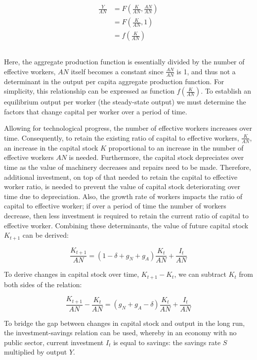 \documentclass[
]{article}
\begin{document}
\[\begin{matrix}
\begin{matrix}
\frac{Y}{AN} & {= F\left( \frac{K}{AN},\frac{AN}{AN} \right)} \\
 & {= F\left( \frac{K}{AN},1 \right)} \\
 & {= f\left( \frac{K}{AN} \right)} \\
\end{matrix} \\
\end{matrix}\]

Here, the aggregate production function is essentially divided by the
number of effective workers, {\(AN\)} itself becomes a constant since
{\(\frac{AN}{AN}\)} is 1, and thus not a determinant in the output per
capita aggregate production function. For simplicity, this relationship
can be expressed as function {\(f\left( \frac{K}{AN} \right)\)}. To
establish an equilibrium output per worker (the steady-state output) we
must determine the factors that change capital per worker over a period
of time.

Allowing for technological progress, the number of effective workers
increases over time. Consequently, to retain the existing ratio of
capital to effective workers, {\(\frac{K}{AN}\)}, an increase in the
capital stock {\(K\)} proportional to an increase in the number of
effective workers {\(AN\)} is needed. Furthermore, the capital stock
depreciates over time as the value of machinery decreases and repairs
need to be made. Therefore, additional investment, on top of that needed
to retain the capital to effective worker ratio, is needed to prevent
the value of capital stock deteriorating over time due to depreciation.
Also, the growth rate of workers impacts the ratio of capital to
effective worker; if over a period of time the number of workers
decrease, then less investment is required to retain the current ratio
of capital to effective worker. Combining these determinants, the value
of future capital stock {\(K_{t + 1}\)} can be derived:

{\[\frac{K_{t + 1}}{AN} = (1 - \delta + g_{N} + g_{A})\frac{K_{t}}{AN} + \frac{I_{t}}{AN}\]}

To derive changes in capital stock over time, {\(K_{t + 1} - K_{t}\)},
we can subtract {\(K_{t}\)} from both sides of the relation:

{\[\frac{K_{t + 1}}{AN} - \frac{K_{t}}{AN} = (g_{N} + g_{A} - \delta)\frac{K_{t}}{AN} + \frac{I_{t}}{AN}\]}

To bridge the gap between changes in capital stock and output in the
long run, the investment-savings relation can be used, whereby in an
economy with no public sector, current investment {\(I_{t}\)} is equal
to savings: the savings rate {\(S\)} multiplied by output {\(Y\)}.
\end{document}

